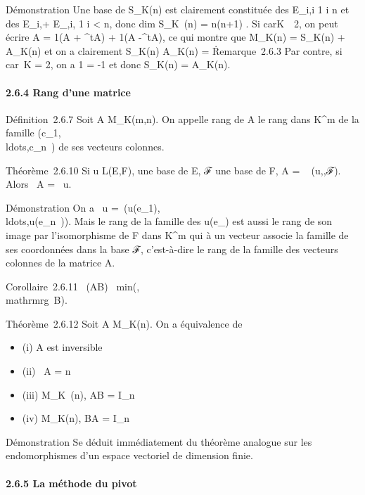 \documentclass[]{article}
\begin{document}
Démonstration Une base de S\_K(n) est clairement constituée des
E\_i,i 1 \leq i \leq n et des E\_i,\jmath + E\_\jmath,i, 1 \leq i
\textless{} \jmath \leq n, donc dim S\_K~(n)
= n(n+1)  . Si
carK\mathrel\neq~~2, on peut
écrire A = 1(A + ^tA) +
1(A -^tA), ce qui montre que
M\_K(n) = S\_K(n) + A\_K(n) et on a clairement
S\_K(n) \bigcap A\_K(n) =
\0\.

Remarque~2.6.3 Par contre, si car~K = 2, on a 1
= -1 et donc S\_K(n) = A\_K(n).

\paragraph{2.6.4 Rang d'une matrice}

Définition~2.6.7 Soit A \in M\_K(m,n). On appelle rang de A le
rang dans K^m de la famille
(c\_1,\\ldots,c\_n~)
de ses vecteurs colonnes.

Théorème~2.6.10 Si u \in L(E,F),  une base de E, ℱ une base de F, A
= \mathrmMat~ (u,,ℱ). Alors
\mathrmrg~A
= \mathrmrg~u.

Démonstration On a
\mathrmrg~u
=\
\mathrmrg(u(e\_1),\\ldots,u(e\_n~)).
Mais le rang de la famille des u(e\_\jmath) est aussi le rang de son
image par l'isomorphisme de F dans K^m qui à un vecteur
associe la famille de ses coordonnées dans la base ℱ, c'est-à-dire le
rang de la famille des vecteurs colonnes de la matrice A.

Corollaire~2.6.11
\mathrmrg~(AB)
\leq\
min(\mathrmrgA,\\mathrmrg~B).

Théorème~2.6.12 Soit A \in M\_K(n). On a équivalence de

\begin{itemize}
\itemsep1pt\parskip0pt
\item
  (i) A est inversible
\item
  (ii) \mathrmrg~A = n
\item
  (iii) \existsB \in M\_K~(n), AB =
  I\_n
\item
  (iv) \existsB \in M\_K(n), BA = I\_n~
\end{itemize}

Démonstration Se déduit immédiatement du théorème analogue sur les
endomorphismes d'un espace vectoriel de dimension finie.

\paragraph{2.6.5 La méthode du pivot}
\end{document}

